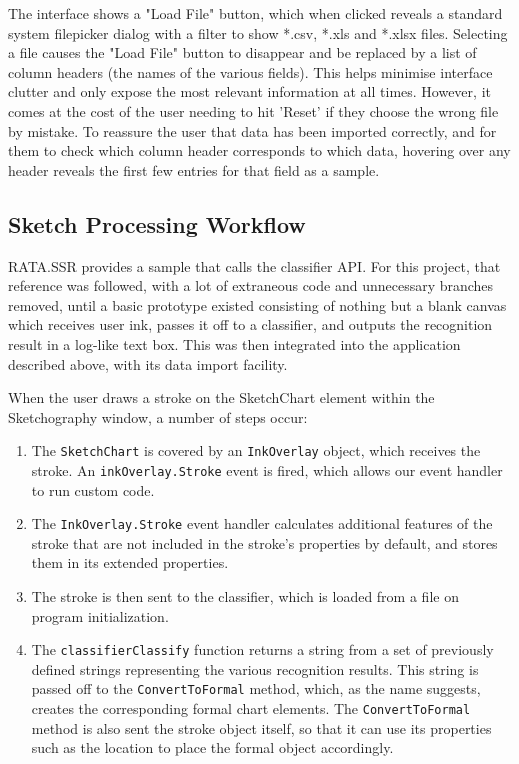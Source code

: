 		
	The interface shows a "Load File" button, which when clicked reveals a standard system filepicker dialog with a filter to show *.csv, *.xls and *.xlsx files.	Selecting a file causes the "Load File" button to disappear and be replaced by a list of column headers (the names of the various fields). This helps minimise interface clutter and only expose the most relevant information at all times. However, it comes at the cost of the user needing to hit 'Reset' if they choose the wrong file by mistake. To reassure the user that data has been imported correctly, and for them to check which column header corresponds to which data, hovering over any header reveals the first few entries for that field as a sample.
	
	
	\subsection{Sketch Processing Workflow}
	RATA.SSR provides a sample that calls the classifier API. For this project, that reference was followed, with a lot of extraneous code and unnecessary branches removed, until a basic prototype existed consisting of nothing but a blank canvas which receives user ink, passes it off to a classifier, and outputs the recognition result in a log-like text box. This was then integrated into the application described above, with its data import facility. 
	
	When the user draws a stroke on the SketchChart element within the Sketchography window, a number of steps occur:
	\begin{enumerate}
	\item The \texttt{SketchChart} is covered by an \texttt{InkOverlay} object, which receives the stroke. An \texttt{inkOverlay.Stroke} event is fired, which allows our event handler to run custom code.
	\item The \texttt{InkOverlay.Stroke} event handler calculates additional features of the stroke that are not included in the stroke's properties by default, and stores them in its extended properties.
	\item The stroke is then sent to the classifier, which is loaded from a file on program initialization.
	\item The \texttt{classifierClassify} function returns a string from a set of previously defined strings representing the various recognition results. This string is passed off to the \texttt{ConvertToFormal} method, which, as the name suggests, creates the corresponding formal chart elements. The \texttt{ConvertToFormal} method is also sent the stroke object itself, so that it can use its properties such as the location to place the formal object accordingly.
	 
	\end{enumerate}


